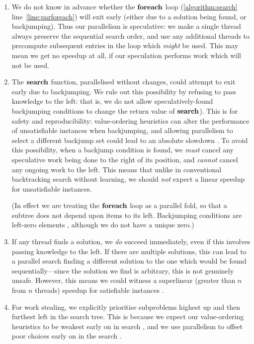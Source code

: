 \documentclass{llncs}
\newcommand{\lineref}[1]{line~\ref{#1}}
\begin{document}
\begin{enumerate}
    \item We do not know in advance whether the $\KwSty{foreach}$ loop (\cref{algorithm:search}
        \lineref{line:parforeach}) will exit early (either due to a solution being found, or
        backjumping). Thus our parallelism is speculative: we make a single thread always preserve
        the sequential search order, and use any additional threads to precompute subsequent entries
        in the loop which \emph{might} be used. This may mean we get no speedup at all, if our
        speculation performs work which will not be used.

    \item The $\KwSty{search}$ function, parallelised without changes, could attempt to exit early
        due to backjumping. We rule out this possibility by refusing to pass knowledge to the left:
        that is, we do not allow speculatively-found backjumping conditions to change the return
        value of $\KwSty{search}$). This is for safety \cite{Trienekens:1990} and reproducibility:
        value-ordering heuristics can alter the performance of unsatisfiable instances when
        backjumping, and allowing parallelism to select a different backjump set could lead to an
        absolute slowdown \cite{Prosser:1993b}. To avoid this possibility, when a backjump condition
        is found, we \emph{must} cancel any speculative work being done to the right of its
        position, and \emph{cannot} cancel any ongoing work to the left.  This means that unlike in
        conventional backtracking search without learning, we should \emph{not} expect a linear
        speedup for unsatisfiable instances.

        (In effect we are treating the $\KwSty{foreach}$ loop as a parallel fold, so that a subtree
        does not depend upon items to its left. Backjumping conditions are left-zero elements
        \cite{Lobachev:2012}, although we do not have a unique zero.)

    \item If any thread finds a solution, we \emph{do} succeed immediately, even if this involves
        passing knowledge to the left. If there are multiple solutions, this can lead to a parallel
        search finding a different solution to the one which would be found sequentially---since the
        solution we find is arbitrary, this is not genuinely unsafe. However, this means we could
        witness a superlinear (greater than $n$ from $n$ threads) speedup for satisfiable instances
        \cite{deBruin:1995}.

    \item For work stealing, we explicitly prioritise subproblems highest up and then furthest left
        in the search tree. This is because we expect our value-ordering heuristics to be weakest
        early on in search \cite{Harvey:1995}, and we use parallelism to offset poor choices early
        on in the search \cite{Chu:2009,McCreesh:2014}.
\end{enumerate}
\end{document}
